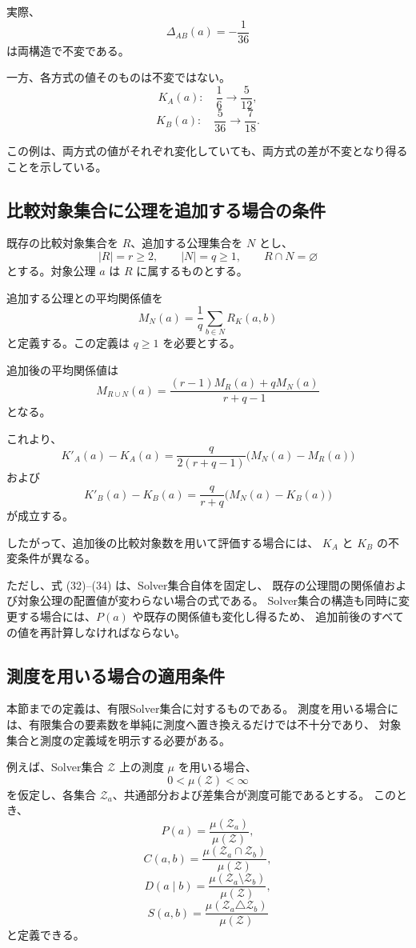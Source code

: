 \documentclass[a4paper,11pt]{ltjsarticle}
\begin{document}
実際、
\[
\Delta_{AB}(a)=-\frac1{36}
\]
は両構造で不変である。

一方、各方式の値そのものは不変ではない。
\[
K_A(a):\quad \frac16\longrightarrow\frac5{12},
\]
\[
K_B(a):\quad \frac5{36}\longrightarrow\frac7{18}.
\]

この例は、両方式の値がそれぞれ変化していても、両方式の差が不変となり得ることを示している。

\subsection{比較対象集合に公理を追加する場合の条件}

既存の比較対象集合を $R$、追加する公理集合を $N$ とし、
\[
|R|=r\geq2,\qquad |N|=q\geq1,\qquad
R\cap N=\varnothing
\]
とする。対象公理 $a$ は $R$ に属するものとする。

追加する公理との平均関係値を
\[
M_N(a)=\frac1q\sum_{b\in N}R_K(a,b)
\]
と定義する。この定義は $q\geq1$ を必要とする。

追加後の平均関係値は
\[
\boxed{
M_{R\cup N}(a)=
\frac{(r-1)M_R(a)+qM_N(a)}{r+q-1}
}
\tag{32}
\]
となる。

これより、
\[
\boxed{
K'_A(a)-K_A(a)=
\frac{q}{2(r+q-1)}
\bigl(M_N(a)-M_R(a)\bigr)
}
\tag{33}
\]
および
\[
\boxed{
K'_B(a)-K_B(a)=
\frac{q}{r+q}
\bigl(M_N(a)-K_B(a)\bigr)
}
\tag{34}
\]
が成立する。

したがって、追加後の比較対象数を用いて評価する場合には、
$K_A$ と $K_B$ の不変条件が異なる。

ただし、式 (32)--(34) は、Solver集合自体を固定し、
既存の公理間の関係値および対象公理の配置値が変わらない場合の式である。
Solver集合の構造も同時に変更する場合には、$P(a)$ や既存の関係値も変化し得るため、
追加前後のすべての値を再計算しなければならない。

\subsection{測度を用いる場合の適用条件}

本節までの定義は、有限Solver集合に対するものである。
測度を用いる場合には、有限集合の要素数を単純に測度へ置き換えるだけでは不十分であり、
対象集合と測度の定義域を明示する必要がある。

例えば、Solver集合 $\mathcal{Z}$ 上の測度 $\mu$ を用いる場合、
\[
0<\mu(\mathcal{Z})<\infty
\]
を仮定し、各集合 $\mathcal{Z}_a$、共通部分および差集合が測度可能であるとする。
このとき、
\[
P(a)=\frac{\mu(\mathcal{Z}_a)}{\mu(\mathcal{Z})},
\]
\[
C(a,b)=
\frac{\mu(\mathcal{Z}_a\cap\mathcal{Z}_b)}
{\mu(\mathcal{Z})},
\]
\[
D(a\mid b)=
\frac{\mu(\mathcal{Z}_a\setminus\mathcal{Z}_b)}
{\mu(\mathcal{Z})},
\]
\[
S(a,b)=
\frac{\mu(\mathcal{Z}_a\triangle\mathcal{Z}_b)}
{\mu(\mathcal{Z})}
\]
と定義できる。
\end{document}
